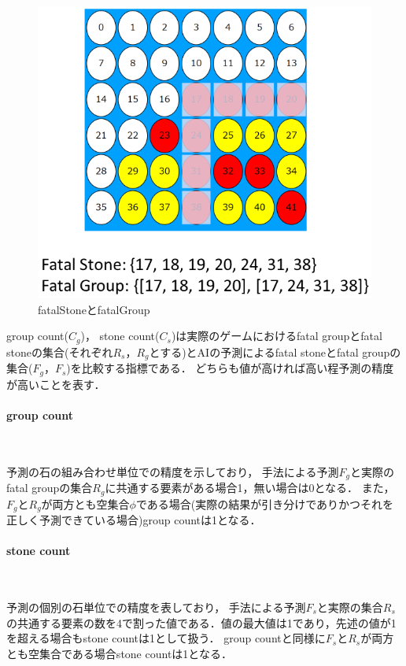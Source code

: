 \begin{figure}[t]
	\centering
	\includegraphics[width=\linewidth]{./figure/fatalGroup.png}
	\caption{fatalStoneとfatalGroup}
	\label{fig:fatalGroup}
\end{figure}
group count($C_g$)， stone count($C_s$)は実際のゲームにおけるfatal groupとfatal stoneの集合(それぞれ$R_s， R_g$とする)とAIの予測によるfatal stoneとfatal groupの集合($F_g， F_s$)を比較する指標である．
どちらも値が高ければ高い程予測の精度が高いことを表す．


\paragraph{group count}~
\par 予測の石の組み合わせ単位での精度を示しており，
手法による予測$F_g$と実際のfatal groupの集合$R_g$に共通する要素がある場合1，無い場合は0となる．
また，$F_g$と$R_g$が両方とも空集合$\phi$である場合(実際の結果が引き分けでありかつそれを正しく予測できている場合)group countは1となる．
\paragraph{stone count}~
\par 予測の個別の石単位での精度を表しており，
手法による予測$F_s$と実際の集合$R_s$の共通する要素の数を4で割った値である．値の最大値は1であり，先述の値が1を超える場合もstone countは1として扱う．
group countと同様に$F_s$と$R_s$が両方とも空集合である場合stone countは1となる．


